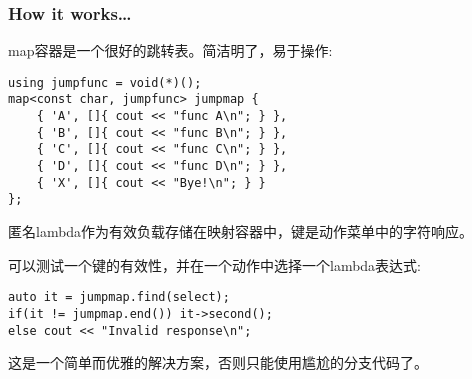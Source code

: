 \subsubsection{How it works…}

map容器是一个很好的跳转表。简洁明了，易于操作:

\begin{lstlisting}[style=styleCXX]
using jumpfunc = void(*)();
map<const char, jumpfunc> jumpmap {
	{ 'A', []{ cout << "func A\n"; } },
	{ 'B', []{ cout << "func B\n"; } },
	{ 'C', []{ cout << "func C\n"; } },
	{ 'D', []{ cout << "func D\n"; } },
	{ 'X', []{ cout << "Bye!\n"; } }
};
\end{lstlisting}

匿名lambda作为有效负载存储在映射容器中，键是动作菜单中的字符响应。

可以测试一个键的有效性，并在一个动作中选择一个lambda表达式:

\begin{lstlisting}[style=styleCXX]
auto it = jumpmap.find(select);
if(it != jumpmap.end()) it->second();
else cout << "Invalid response\n";
\end{lstlisting}

这是一个简单而优雅的解决方案，否则只能使用尴尬的分支代码了。









